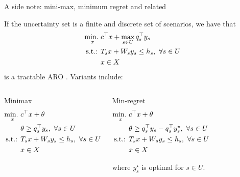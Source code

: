 \begin{frame}{A side note: mini-max, minimum regret and related}

If the uncertainty set is a finite and discrete set of scenarios, we have that 
%
\begin{align*}
	\mathop{\text{min.} \ }_x & c^\top x + \max_{s \in U} q_s^\top y_s \\
	\text{s.t.: } & T_sx + W_s y_s \le h_s, \ \forall s \in U \\
	& x \in X
\end{align*}
%
is a \alert{tractable} ARO \cite{mulvey1995robust}. \pause Variants include:

\vspace{-12pt}
\begin{columns}
	\begin{block}{Minimax}
	\vspace{-18pt} 
		\begin{align*}
			\mathop{\text{min.} \ }_x & c^\top x + \theta \\
			& \theta \ge q_s^\top y_s, \ \forall s \in U \\
			\text{s.t.: } & T_s x + W_s y_s \le h_s, \ \forall s \in U \\
			& x \in X
		\end{align*}
	\end{block}	
		\begin{block}{Min-regret}
	\vspace{-18pt} 
		\begin{align*}
			\mini_x & c^\top x + \theta \\
			& \theta \ge q_s^\top y_s - q_s^\top y^\star_s, \ \forall s \in U \\
			\text{s.t.: } & T_sx + W_s y_s \le h_s, \ \forall s \in U \\
			& x \in X
		\end{align*}
		
		\vspace{-12pt}
		where $y^\star_s$ is optimal for $s \in U$.
	\end{block}	
\end{columns}
	
\end{frame}


